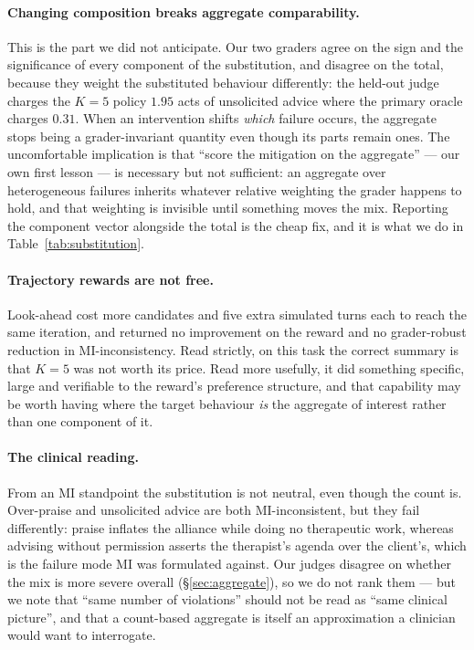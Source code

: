 \paragraph{Changing composition breaks aggregate comparability.} This is the part we did not
anticipate. Our two graders agree on the sign and the significance of every component of the
substitution, and disagree on the total, because they weight the substituted behaviour
differently: the held-out judge charges the $K{=}5$ policy $1.95$ acts of unsolicited advice where
the primary oracle charges $0.31$. When an intervention shifts \emph{which} failure occurs, the
aggregate stops being a grader-invariant quantity even though its parts remain ones. The
uncomfortable implication is that ``score the mitigation on the aggregate'' --- our own first
lesson --- is necessary but not sufficient: an aggregate over heterogeneous failures inherits
whatever relative weighting the grader happens to hold, and that weighting is invisible until
something moves the mix. Reporting the component vector alongside the total is the cheap fix, and
it is what we do in Table~\ref{tab:substitution}.

\paragraph{Trajectory rewards are not free.} Look-ahead cost more candidates and five extra
simulated turns each to reach the same iteration, and returned no improvement on the reward and no
grader-robust reduction in MI-inconsistency. Read strictly, on this task the correct summary is
that $K{=}5$ was not worth its price. Read more usefully, it did something specific, large and
verifiable to the reward's preference structure, and that capability may be worth having where the
target behaviour \emph{is} the aggregate of interest rather than one component of it.

\paragraph{The clinical reading.} From an MI standpoint the substitution is not neutral, even
though the count is. Over-praise and unsolicited advice are both MI-inconsistent, but they fail
differently: praise inflates the alliance while doing no therapeutic work, whereas advising without
permission asserts the therapist's agenda over the client's, which is the failure mode MI was
formulated against. Our judges disagree on whether the \Kf{} mix is more severe overall
(\S\ref{sec:aggregate}), so we do not rank them --- but we note that ``same number of violations''
should not be read as ``same clinical picture'', and that a count-based aggregate is itself an
approximation a clinician would want to interrogate.

